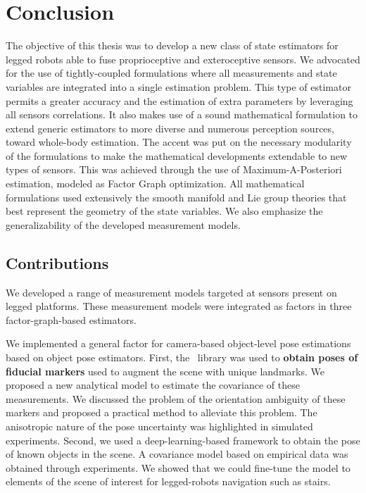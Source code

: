 \chapter{Conclusion}

The objective of this thesis was to develop a new class of state estimators for legged robots able to fuse proprioceptive and exteroceptive
sensors. We advocated for the use of tightly-coupled formulations where all measurements and state variables are integrated into a single estimation 
problem. This type of estimator permits a greater accuracy and the estimation of extra parameters by leveraging all sensors correlations.
It also makes use of a sound mathematical formulation to extend generic estimators to more diverse and numerous perception sources, toward whole-body estimation.
The accent was put on the necessary modularity of the formulations to make the mathematical developments extendable to new types of sensors. This 
was achieved through the use of Maximum-A-Posteriori estimation, modeled as Factor Graph optimization. All mathematical formulations used extensively the smooth manifold
and Lie group theories that best represent the geometry of the state variables. We also emphasize the generalizability of the developed measurement models. 

\section{Contributions}

We developed a range of measurement models targeted at sensors present on legged platforms. These measurement models were integrated as factors in 
three factor-graph-based estimators.

We implemented a general factor for camera-based object-level pose estimations based on object pose estimators. 
First, the \apriltag\ library was used 
to \textbf{obtain poses of fiducial markers} used to augment the scene with unique landmarks. We proposed a new analytical model to estimate the covariance of 
these measurements. We discussed the problem of the orientation ambiguity of these markers and proposed a practical method to alleviate this problem.
The anisotropic nature of the pose uncertainty was highlighted in simulated experiments. 
Second, we used a deep-learning-based framework to obtain the pose of known objects in the scene. A covariance model based on empirical data was obtained through
experiments. We showed that we could fine-tune the model to elements of the scene of interest for legged-robots navigation such as stairs.

